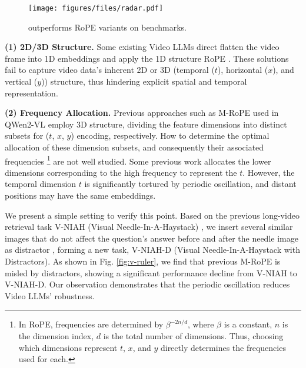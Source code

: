 \begin{figure}
\centering
\texttt{[image: figures/files/radar.pdf]}
\vspace{-6pt}
\caption{\methodname outperforms RoPE variants on benchmarks.}
\label{fig:radar}
\vspace{-12pt}
\end{figure}



\textbf{(1) 2D/3D Structure.} Some existing Video LLMs direct flatten the video frame into 1D embeddings and apply the 1D structure RoPE \cite{su2024roformer,gao2024tc}.
These solutions fail to capture video data's inherent 2D or 3D (temporal ($t$), horizontal ($x$), and vertical ($y$)) structure, thus hindering explicit spatial and temporal representation.


\textbf{(2) Frequency Allocation.} Previous approaches such as M-RoPE used in QWen2-VL \cite{wang2024qwen2} employ 3D structure, dividing the feature dimensions into distinct subsets for ($t$, $x$, $y$) encoding, respectively.
How to determine the optimal allocation of these dimension subsets, and consequently their associated frequencies 
\footnote{In RoPE, frequencies are determined by $\beta^{-2n/d}$, where $\beta$ is a constant, $n$ is the dimension index, $d$ is the total number of dimensions. Thus, choosing which dimensions represent $t$, $x$, and $y$ directly determines the frequencies used for each.} are not well studied.
Some previous work allocates the lower dimensions corresponding to the high frequency to represent the $t$.
However, the temporal dimension $t$ is significantly tortured by periodic oscillation, and distant positions may have the same embeddings.

We present a simple setting to verify this point.
Based on the previous long-video retrieval task V-NIAH (Visual Needle-In-A-Haystack) \cite{zhang2024longva}, we insert several similar images that do not affect the question's answer before and after the needle image as distractor \cite{hsieh2024ruler,yuan2024lv}, forming a new task, V-NIAH-D (Visual Needle-In-A-Haystack with Distractors).
As shown in Fig. \ref{fig:v-ruler}, we find that previous M-RoPE is misled by distractors, showing a significant performance decline from V-NIAH to V-NIAH-D.
Our observation demonstrates that the periodic oscillation reduces Video LLMs' robustness.

